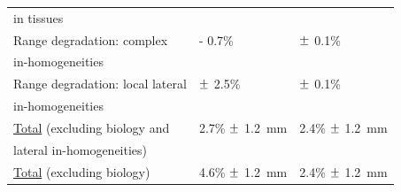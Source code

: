 \begin{table}[!htbp]
\begin{tabular}{m{6cm} P{3.6cm}  P{3.6cm}}
\hspace{0.2cm} in tissues & & \\
\hspace{0.2cm}  Range degradation: complex & - 0.7\%  & $\varpm$ 0.1\%  \\
\hspace{0.2cm} in-homogeneities  & & \\
\hspace{0.2cm}  Range degradation: local lateral & $\varpm$ 2.5\% & $\varpm$ 0.1\%\\
\hspace{0.2cm} in-homogeneities  & & \\
\midrule
\hspace{0.5cm}  \underline{Total} (excluding biology and & 2.7\% $\varpm$ 1.2~mm & 2.4\% $\varpm$ 1.2~mm \\
\hspace{0.7cm} lateral in-homogeneities) & & \\
\hspace{0.5cm}  \underline{Total} (excluding biology) & 4.6\% $\varpm$ 1.2~mm  & 2.4\% $\varpm$ 1.2~mm  \\
\bottomrule
\end{tabular}
\end{table}      


